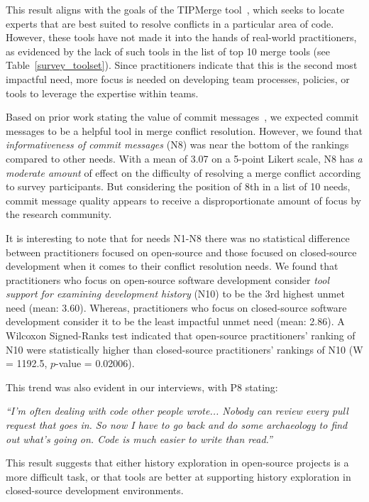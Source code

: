 This result aligns with the goals of the TIPMerge tool~\cite{CostaSarma}, which seeks to locate experts that are best suited to resolve conflicts in a particular area of code.
However, these tools have not made it into the hands of real-world practitioners, as evidenced by the lack of such tools in the list of top 10 merge tools (see Table~\ref{survey_toolset}).
Since practitioners indicate that this is the second most impactful need, more focus is needed on developing team processes, policies, or tools to leverage the expertise within teams.

Based on prior work stating the value of commit messages~\cite{yamauchi2014clustering, hindle2009automatic, cortes2014automatically, hattori2008nature}, we expected commit messages to be a helpful tool in merge conflict resolution.
However, we found that \textit{informativeness of commit messages} (N8) was near the bottom of the rankings compared to other needs.
With a mean of 3.07 on a 5-point Likert scale, N8 has \textit{a moderate amount} of effect on the difficulty of resolving a merge conflict according to survey participants.
But considering the position of 8th in a list of 10 needs, commit message quality appears to receive a disproportionate amount of focus by the research community.

\label{oss_vs_closed_tool_support} 
It is interesting to note that for needs N1-N8 there was no statistical difference between practitioners focused on open-source and those focused on closed-source development when it comes to their conflict resolution needs.
We found that practitioners who focus on open-source software development consider \textit{tool support for examining development history} (N10) to be the 3rd highest unmet need (mean: 3.60).
Whereas, practitioners who focus on closed-source software development consider it to be the least impactful unmet need (mean: 2.86).
A Wilcoxon Signed-Ranks test indicated that open-source practitioners' ranking of N10 were statistically higher than closed-source practitioners' rankings of N10 (W = 1192.5, $p$-value = 0.02006).

This trend was also evident in our interviews, with P8 stating:

\begin{displayquote}
\textit{``I'm often dealing with code other people wrote... Nobody can review every pull request that goes in. So now I have to go back and do some archaeology to find out what's going on. Code is much easier to write than read.''}
\end{displayquote}

This result suggests that either history exploration in open-source projects is a more difficult task, or that tools are better at supporting history exploration in closed-source development environments.

